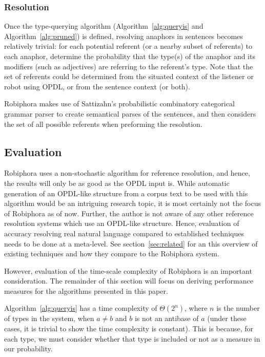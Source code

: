 \documentclass[12pt]{article}
\begin{document}
\subsubsection{Resolution}

Once the type-querying algorithm (Algorithm~\ref{alg:queryis} and
Algorithm~\ref{alg:pruned}) is defined, resolving anaphors in sentences
becomes relatively trivial: for each potential referent (or a nearby subset of
referents) to each anaphor, determine the probability that the type(s) of the
anaphor and its modifiers (such as adjectives) are referring to the referent's
type. Note that the set of referents could be determined from the situated
context of the listener or robot using OPDL, or from the sentence context (or
both).


Robiphora makes use of Sattizahn's probabilistic combinatory categorical
grammar parser\cite{sattizahn} to create semantical parses of the sentences,
and then considers the set of all possible referents when preforming the
resolution.

\subsection{Evaluation}

Robiphora uses a non-stochastic algorithm for reference resolution, and hence,
the results will only be as good as the OPDL input is. While automatic
generation of an OPDL-like structure from a corpus text to be used with this
algorithm would be an intriguing research topic, it is most certainly not the
focus of Robiphora as of now. Further, the author is not aware of any other
reference resolution systems which use an OPDL-like structure. Hence,
evaluation of accuracy resolving real natural language compared to established
techniques needs to be done at a meta-level. See section~\ref{sec:related} for
an this overview of existing techniques and how they compare to the Robiphora
system.

However, evaluation of the time-scale complexity of Robiphora is an important
consideration. The remainder of this section will focus on deriving performance
measures for the algorithms presented in this paper.

Algorithm~\ref{alg:queryis} has a time complexity of $\Theta(2^n)$, where $n$
is the number of types in the system, when $a \ne b$ and $b$ is not an antibase
of $a$ (under these cases, it is trivial to show the time complexity is
constant). This is because, for each type, we must consider whether that type
is included or not as a measure in our probability.
\end{document}
